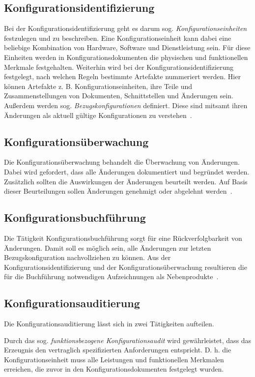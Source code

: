 \documentclass[runningheads,a4paper]{uwsese}
\begin{document}
\subsection{Konfigurationsidentifizierung}
Bei der Konfigurationsidentifizierung geht es darum sog.
{\em Konfigurationseinheiten} festzulegen und zu beschreiben. Eine
Konfigurationseinheit kann dabei eine beliebige Kombination von Hardware,
Software und Dienstleistung sein. Für diese Einheiten werden in
Konfigurationsdokumenten die physischen und funktionellen Merkmale festgehalten.
Weiterhin wird bei der Konfigurationsidentifizierung festgelegt, nach welchen
Regeln bestimmte Artefakte nummeriert werden. Hier können Artefakte z. B.
Konfigurationseinheiten, ihre Teile und Zusammenstellungen von Dokumenten,
Schnittstellen und Änderungen sein. Außerdem werden sog.
{\em Bezugskonfigurationen} definiert. Diese sind mitsamt ihren Änderungen als
aktuell gültige Konfigurationen zu verstehen~\cite[S. 6f]{weischedel2002}.

\subsection{Konfigurationsüberwachung}
Die Konfigurationsüberwachung behandelt die Überwachung von Änderungen. Dabei
wird gefordert, dass alle Änderungen dokumentiert und begründet werden.
Zusätzlich sollten die Auswirkungen der Änderungen beurteilt werden. Auf Basis
dieser Beurteilungen sollen Änderungen genehmigt oder abgelehnt
werden~\cite[S. 7]{weischedel2002}.

\subsection{Konfigurationsbuchführung}
Die Tätigkeit Konfigurationsbuchführung sorgt für eine Rückverfolgbarkeit von
Änderungen. Damit soll es möglich sein, alle Änderungen zur letzten
Bezugskonfiguration nachvollziehen zu können. Aus der
Konfigurationsidentifizierung und der Konfigurationsüberwachung resultieren
die für die Buchführung notwendigen Aufzeichnungen als
Nebenprodukte~\cite[S. 7]{weischedel2002}.

\subsection{Konfigurationsauditierung}
Die Konfigurationsauditierung lässt sich in zwei Tätigkeiten aufteilen.

Durch das sog. {\em funktionsbezogene Konfigurationsaudit} wird gewährleistet,
dass das Erzeugnis den vertraglich spezifizierten Anforderungen entspricht.
D. h. die Konfigurationseinheit muss alle Leistungen und funktionellen Merkmalen
erreichen, die zuvor in den Konfigurationsdokumenten festgelegt wurden.
\end{document}
